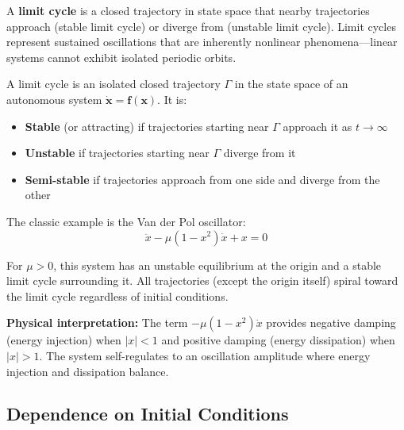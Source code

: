 A \textbf{limit cycle} is a closed trajectory in state space that nearby trajectories approach (stable limit cycle) or diverge from (unstable limit cycle). Limit cycles represent sustained oscillations that are inherently nonlinear phenomena---linear systems cannot exhibit isolated periodic orbits.

\begin{definition}
A limit cycle is an isolated closed trajectory $\Gamma$ in the state space of an autonomous system $\dot{\mathbf{x}} = \mathbf{f}(\mathbf{x})$. It is:
\begin{itemize}
    \item \textbf{Stable} (or attracting) if trajectories starting near $\Gamma$ approach it as $t \to \infty$
    \item \textbf{Unstable} if trajectories starting near $\Gamma$ diverge from it
    \item \textbf{Semi-stable} if trajectories approach from one side and diverge from the other
\end{itemize}
\end{definition}

The classic example is the Van der Pol oscillator:
\begin{equation}
\ddot{x} - \mu(1 - x^2)\dot{x} + x = 0
\label{eq:van_der_pol}
\end{equation}

For $\mu > 0$, this system has an unstable equilibrium at the origin and a stable limit cycle surrounding it. All trajectories (except the origin itself) spiral toward the limit cycle regardless of initial conditions.

\textbf{Physical interpretation:} The term $-\mu(1-x^2)\dot{x}$ provides negative damping (energy injection) when $|x| < 1$ and positive damping (energy dissipation) when $|x| > 1$. The system self-regulates to an oscillation amplitude where energy injection and dissipation balance.


\subsection{Dependence on Initial Conditions}

